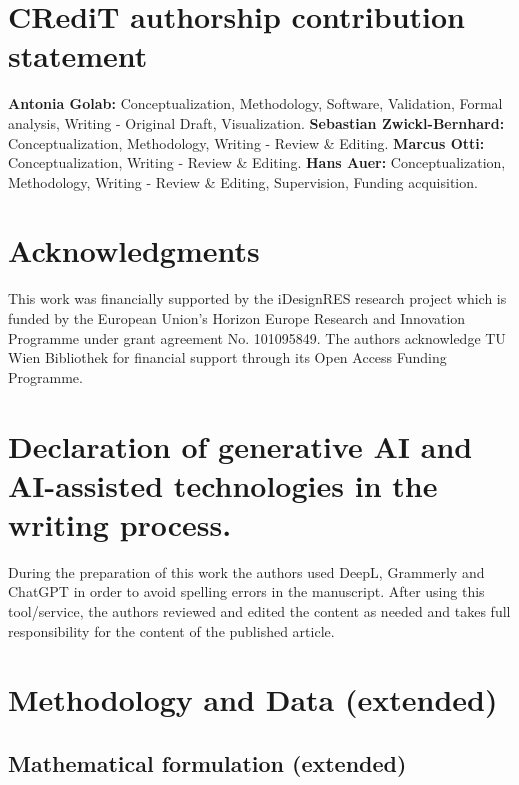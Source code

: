 \documentclass[preprint,review,11pt, authoryear]{elsarticle}
\begin{document}
\section{CRediT authorship contribution statement}

\textbf{Antonia Golab:} Conceptualization, Methodology, Software, Validation, Formal analysis, Writing - Original Draft, Visualization.  
\textbf{Sebastian Zwickl-Bernhard:} Conceptualization, Methodology, Writing - Review \& Editing.  
\textbf{Marcus Otti:} Conceptualization, Writing - Review \& Editing.  
\textbf{Hans Auer:} Conceptualization, Methodology, Writing - Review \& Editing, Supervision, Funding acquisition.


\section{Acknowledgments}
This work was financially supported by the iDesignRES research project which is funded by the European Union’s Horizon Europe Research and Innovation Programme under grant agreement No. 101095849.  
The authors acknowledge TU Wien Bibliothek for financial support through its Open Access Funding Programme.

\section{Declaration of generative AI and AI-assisted technologies in the writing process.}
During the preparation of this work the authors used DeepL, Grammerly and ChatGPT in order to avoid spelling errors in the manuscript. After using this tool/service, the authors reviewed and edited the content as needed and takes full responsibility for the content of the published article.


\appendix

\section{Methodology and Data (extended)} 

\label{sec: extended_math_form}
\subsection{Mathematical formulation (extended)}
\end{document}
